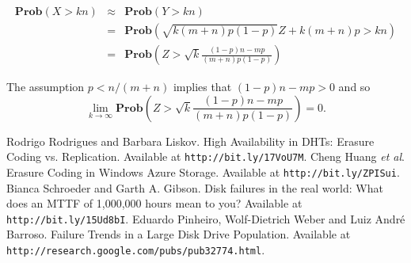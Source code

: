 \documentclass[11pt]{article}
\begin{document}
\begin{eqnarray*}
\mathbf{Prob}(X > kn) &\approx& \mathbf{Prob}(Y > kn) \\
&=& \mathbf{Prob}(\sqrt{k(m+n)p(1-p)} Z + k(m+n)p > kn) \\
&=& \mathbf{Prob}\left(Z > \sqrt{k} \frac{(1-p)n - mp}{(m+n)p(1-p)}\right) 
\end{eqnarray*}

The assumption $p < n/(m+n)$ implies that $(1-p)n - mp > 0$ and so 
\[ \lim_{k\to\infty} \mathbf{Prob}\left(Z > \sqrt{k} \frac{(1-p)n - mp}{(m+n)p(1-p)}\right) = 0.\]

\begin{thebibliography}{9}
 Rodrigo Rodrigues and Barbara Liskov. High Availability in DHTs: Erasure Coding vs. Replication. Available at \texttt{http://bit.ly/17VoU7M}.
 Cheng Huang \emph{et al}. Erasure Coding in Windows Azure Storage. Available at \texttt{http://bit.ly/ZPISui}.
 Bianca Schroeder and Garth A. Gibson. Disk failures in the real world: What does an MTTF of 1,000,000 hours mean to you? Available at \texttt{http://bit.ly/15Ud8bI}.
 Eduardo Pinheiro, Wolf-Dietrich Weber and Luiz Andr\'{e} Barroso. Failure Trends in a Large Disk Drive Population. Available at \texttt{http://research.google.com/pubs/pub32774.html}.

\end{thebibliography}
\end{document}
